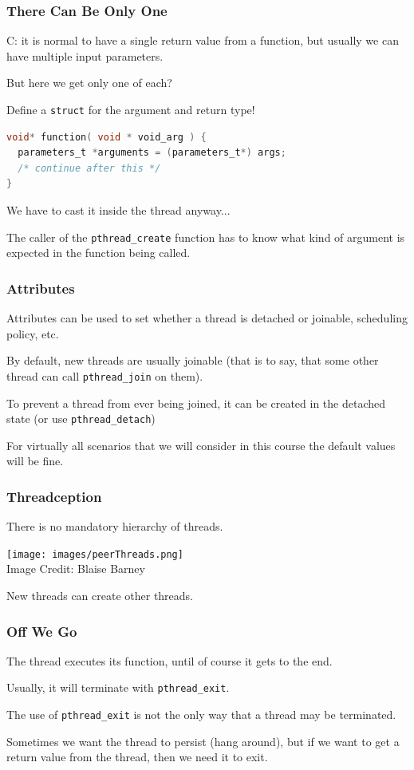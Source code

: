 \begin{frame}[fragile]
	\frametitle{There Can Be Only One}

	C: it is normal to have a single return value from a function, but usually we can have multiple input parameters.

	But here we get only one of each?

	Define a \texttt{struct} for the argument and return type!

	\begin{lstlisting}[language=C]
void* function( void * void_arg ) {
  parameters_t *arguments = (parameters_t*) args;
  /* continue after this */
}
\end{lstlisting}

	We have to cast it inside the thread anyway...

	The caller of the \texttt{pthread\_create} function has to know what kind of argument is expected in the function being called.

\end{frame}


\begin{frame}
	\frametitle{Attributes}

	Attributes can be used to set whether a thread is detached or joinable, scheduling policy, etc.

	By default, new threads are usually joinable (that is to say, that some other thread can call \texttt{pthread\_join} on them).

	To prevent a thread from ever being joined, it can be created in the detached state (or use \texttt{pthread\_detach})

	For virtually all scenarios that we will consider in this course the default values will be fine.

\end{frame}


\begin{frame}
\frametitle{Threadception}

There is no mandatory hierarchy of threads.

\begin{center}
	\texttt{[image: images/peerThreads.png]}\\
	\hfill Image Credit: Blaise Barney
\end{center}

New threads can create other threads.

\end{frame}


\begin{frame}
	\frametitle{Off We Go}

	The thread executes its function, until of course it gets to the end.

	Usually, it will terminate with \texttt{pthread\_exit}.

	The use of \texttt{pthread\_exit} is not the only way that a thread may be terminated.

	Sometimes we want the thread to persist (hang around), but if we want to get a return value from the thread, then we need it to exit.

\end{frame}


